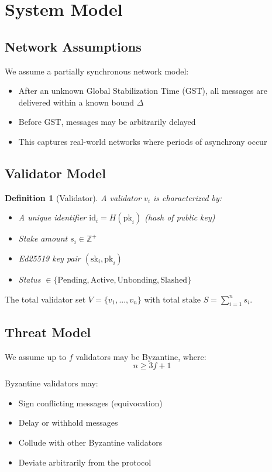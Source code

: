 \documentclass[11pt,a4paper]{article}
\newtheorem{definition}{Definition}
\begin{document}
\section{System Model}

\subsection{Network Assumptions}

We assume a partially synchronous network model:
\begin{itemize}
    \item After an unknown Global Stabilization Time (GST), all messages are delivered within a known bound $\Delta$
    \item Before GST, messages may be arbitrarily delayed
    \item This captures real-world networks where periods of asynchrony occur
\end{itemize}

\subsection{Validator Model}

\begin{definition}[Validator]
A validator $v_i$ is characterized by:
\begin{itemize}
    \item A unique identifier $\text{id}_i = H(\text{pk}_i)$ (hash of public key)
    \item Stake amount $s_i \in \mathbb{Z}^+$
    \item Ed25519 key pair $(\text{sk}_i, \text{pk}_i)$
    \item Status $\in \{\text{Pending}, \text{Active}, \text{Unbonding}, \text{Slashed}\}$
\end{itemize}
\end{definition}

The total validator set $V = \{v_1, ..., v_n\}$ with total stake $S = \sum_{i=1}^n s_i$.

\subsection{Threat Model}

We assume up to $f$ validators may be Byzantine, where:
$$n \geq 3f + 1$$

Byzantine validators may:
\begin{itemize}
    \item Sign conflicting messages (equivocation)
    \item Delay or withhold messages
    \item Collude with other Byzantine validators
    \item Deviate arbitrarily from the protocol
\end{itemize}
\end{document}
